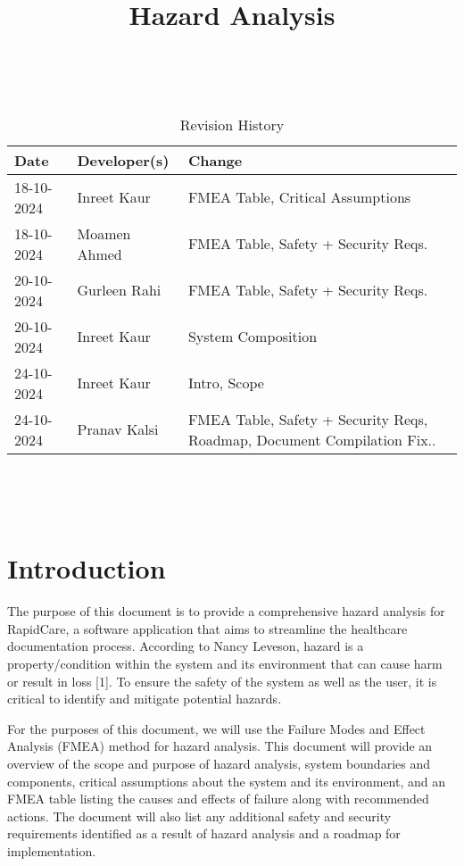 \documentclass{article}
\title{Hazard Analysis\\\progname}
\author{\authname}
\date{}
\begin{document}
\maketitle
\thispagestyle{empty}

~\newpage


\begin{table}[hp]
\caption{Revision History} \label{TblRevisionHistory}
\begin{tabularx}{\textwidth}{llX}
\toprule
\textbf{Date} & \textbf{Developer(s)} & \textbf{Change}\\
\midrule
18-10-2024 & Inreet Kaur & FMEA Table, Critical Assumptions\\
18-10-2024 & Moamen Ahmed & FMEA Table, Safety + Security Reqs.\\
20-10-2024 & Gurleen Rahi & FMEA Table, Safety + Security Reqs.\\
20-10-2024 & Inreet Kaur & System Composition\\
24-10-2024 & Inreet Kaur & Intro, Scope\\
24-10-2024 & Pranav Kalsi & FMEA Table, Safety + Security Reqs, Roadmap, Document Compilation Fix..\\
\bottomrule
\end{tabularx}
\end{table}

~\newpage

\tableofcontents

~\newpage



\section{Introduction}

The purpose of this document is to provide a comprehensive hazard analysis for RapidCare, a software application that aims to streamline the healthcare documentation process. According to Nancy Leveson, hazard is a property/condition within the system and its environment that can cause harm or result in loss [1]. To ensure the safety of the system as well as the user, it is critical to identify and mitigate potential hazards.

For the purposes of this document, we will use the Failure Modes and Effect Analysis (FMEA) method for hazard analysis. This document will provide an overview of the scope and purpose of hazard analysis, system boundaries and components, critical assumptions about the system and its environment, and an FMEA table listing the causes and effects of failure along with recommended actions. The document will also list any additional safety and security requirements identified as a result of hazard analysis and a roadmap for implementation.
\end{document}
